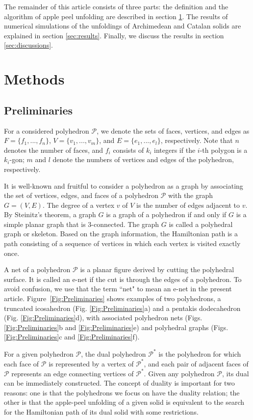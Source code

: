 \documentclass[]{interact}
\theoremstyle{plain}%
\theoremstyle{definition}
\theoremstyle{remark}
\begin{document}
The remainder of this article consists of three parts: the definition and the algorithm of apple peel unfolding are described in section \ref{sec:methods}. The results of numerical simulations of the unfoldings of Archimedean and Catalan solids are explained in section \ref{sec:results}. Finally, we discuss the results in section \ref{sec:discussions}.

\section{Methods} \label{sec:methods}


\subsection{Preliminaries}

For a considered polyhedron $\mathcal{P}$, we denote the sets of faces, vertices, and edges as $F=\{f_1, ..., f_n\}$, $V=\{v_1, ..., v_m\}$, and $E=\{e_1, ..., e_l\}$, respectively. Note that $n$ denotes the number of faces, and $f_i$ consists of $k_i$ integers if the $i$-th polygon is a $k_i$-gon; $m$ and $l$ denote the numbers of vertices and edges of the polyhedron, respectively. 

It is well-known and fruitful to consider a polyhedron as a graph by associating the set of vertices, edges, and faces of a polyhedron $\mathcal{P}$ with the graph $G=(V, E)$. The degree of a vertex $v$ of $V$ is the number of edges adjacent to $v$. By Steinitz's theorem, a graph $G$ is a graph of a polyhedron if and only if $G$ is a simple planar graph that is 3-connected. The graph $G$ is called  a polyhedral graph or skeleton. Based on the graph information, the Hamiltonian path is a path consisting of a sequence of vertices in which each vertex is visited exactly once. 

A net of a polyhedron $\mathcal{P}$ is a planar figure derived by cutting the polyhedral surface. It is called an e-net if the cut is through the edges of a polyhedron. To avoid confusion, we use that the term ``net" to mean an e-net in the present article. Figure~\ref{Fig:Preliminaries} shows examples of two polyhedrons, a truncated icosahedron (Fig. \ref{Fig:Preliminaries}a) and a pentakis dodecahedron (Fig. \ref{Fig:Preliminaries}d), with associated polyhedron nets (Figs. \ref{Fig:Preliminaries}b and \ref{Fig:Preliminaries}e) and polyhedral graphs (Figs. \ref{Fig:Preliminaries}c and \ref{Fig:Preliminaries}f).

For a given polyhedron $\mathcal{P}$, the dual polyhedron $\mathcal{P}^*$ is the polyhedron for which each face of $\mathcal{P}$ is represented by a vertex of $\mathcal{P}^*$, and each pair of adjacent faces of $\mathcal{P}$ represents an edge connecting vertices of $\mathcal{P}^*$. Given any polyhedron $\mathcal{P}$, its dual can be immediately constructed. The concept of duality is important for two reasons: one is that the polyhedrons we focus on have the duality relation; the other is that the apple-peel unfolding of a given solid is equivalent to the search for the Hamiltonian path of its dual solid with some restrictions.
\end{document}
